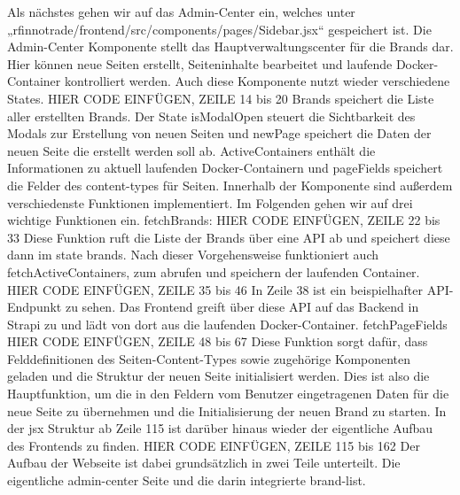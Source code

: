 Als nächstes gehen wir auf das Admin-Center ein, welches unter „rfinnotrade/frontend/src/components/pages/Sidebar.jsx“ gespeichert ist. Die Admin-Center Komponente stellt das Hauptverwaltungscenter für die Brands dar. Hier können neue Seiten erstellt, Seiteninhalte bearbeitet und laufende Docker-Container kontrolliert werden.
Auch diese Komponente nutzt wieder verschiedene States.
HIER CODE EINFÜGEN, ZEILE 14 bis 20
Brands speichert die Liste aller erstellten Brands. Der State isModalOpen steuert die Sichtbarkeit des Modals zur Erstellung von neuen Seiten und newPage speichert die Daten der neuen Seite die erstellt werden soll ab. ActiveContainers enthält die Informationen zu aktuell laufenden Docker-Containern und pageFields speichert die Felder des content-types für Seiten.
Innerhalb der Komponente sind außerdem verschiedenste Funktionen implementiert. Im Folgenden gehen wir auf drei wichtige Funktionen ein.
fetchBrands:
HIER CODE EINFÜGEN, ZEILE 22 bis 33
Diese Funktion ruft die Liste der Brands über eine API ab und speichert diese dann im state brands. Nach dieser Vorgehensweise funktioniert auch fetchActiveContainers, zum abrufen und speichern der laufenden Container.
HIER CODE EINFÜGEN, ZEILE 35 bis 46
In Zeile 38 ist ein beispielhafter API-Endpunkt zu sehen. Das Frontend greift über diese API auf das Backend in Strapi zu und lädt von dort aus die laufenden Docker-Container. 
fetchPageFields
HIER CODE EINFÜGEN, ZEILE 48 bis 67
Diese Funktion sorgt dafür, dass Felddefinitionen des Seiten-Content-Types sowie zugehörige Komponenten geladen und die Struktur der neuen Seite initialisiert werden. Dies ist also die Hauptfunktion, um die in den Feldern vom Benutzer eingetragenen Daten für die neue Seite zu übernehmen und die Initialisierung der neuen Brand zu starten.
In der jsx Struktur ab Zeile 115 ist darüber hinaus wieder der eigentliche Aufbau des Frontends zu finden.
HIER CODE EINFÜGEN, ZEILE 115 bis 162
Der Aufbau der Webseite ist dabei grundsätzlich in zwei Teile unterteilt. Die eigentliche admin-center Seite und die darin integrierte brand-list.